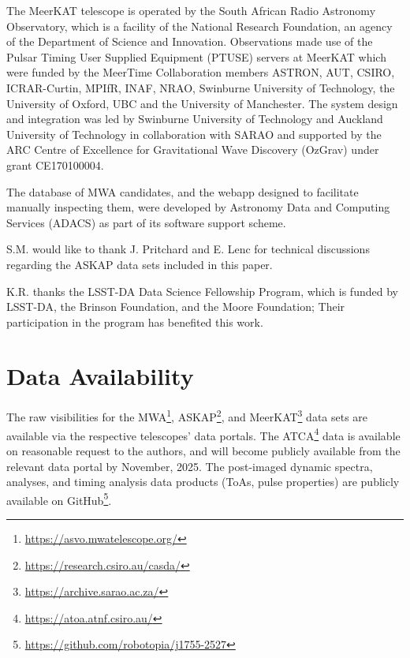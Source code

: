 \documentclass[fleqn,usenatbib]{mnras}
\begin{document}
The MeerKAT telescope is operated by the South African Radio Astronomy Observatory, which is a facility of the National Research Foundation, an agency of the Department of Science and Innovation.
Observations made use of the Pulsar Timing User Supplied Equipment (PTUSE) servers at MeerKAT which were funded by the MeerTime Collaboration members ASTRON, AUT, CSIRO, ICRAR-Curtin, MPIfR, INAF, NRAO, Swinburne University of Technology, the University of Oxford, UBC and the University of Manchester.  The system design and integration was led by Swinburne University of Technology and Auckland University of Technology in collaboration with SARAO and supported by the ARC Centre of Excellence for Gravitational Wave Discovery (OzGrav) under grant CE170100004.

The database of MWA candidates, and the webapp designed to facilitate manually inspecting them, were developed by Astronomy Data and Computing Services (ADACS) as part of its software support scheme.

S.M. would like to thank J. Pritchard and E. Lenc for technical discussions regarding the ASKAP data sets included in this paper.

K.R. thanks the LSST-DA Data Science Fellowship Program, which is funded by LSST-DA, the Brinson Foundation, and the Moore Foundation; Their participation in the program has benefited this work.
\section*{Data Availability}

The raw visibilities for the MWA\footnote{\url{https://asvo.mwatelescope.org/}}, ASKAP\footnote{\url{https://research.csiro.au/casda/}}, and MeerKAT\footnote{\url{https://archive.sarao.ac.za/}} data sets are available via the respective telescopes' data portals.
The ATCA\footnote{\url{https://atoa.atnf.csiro.au/}} data is available on reasonable request to the authors, and will become publicly available from the relevant data portal by November, 2025.
The post-imaged dynamic spectra, analyses, and timing analysis data products (ToAs, pulse properties) are publicly available on GitHub\footnote{\url{https://github.com/robotopia/j1755-2527}}.
 
\end{document}

